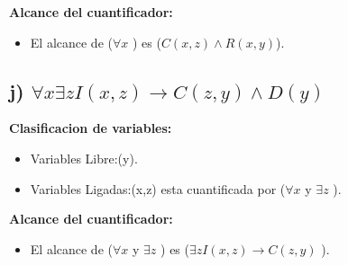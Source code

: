 \documentclass[11pt,letterpaper]{article}
\begin{document}
\textbf{Alcance del cuantificador:}
\begin{itemize}
    \item El alcance de ($\forall x$ ) es ($C(x,z) \wedge  R(x,y)$).
\end{itemize}
\subsection*{j) $\forall x \exists z I(x,z) \rightarrow C(z,y) \wedge  D(y)$}

\textbf{Clasificacion de variables:}
\begin{itemize}
    \item Variables Libre:(y).
    \item Variables Ligadas:(x,z) esta cuantificada por ($\forall x$ y $\exists z$ ).
\end{itemize}

\textbf{Alcance del cuantificador:}
\begin{itemize}
    \item El alcance de ($\forall x$ y $\exists z$ ) es ($\exists z I(x,z) \rightarrow C(z,y)$ ).
\end{itemize}
\end{document}
